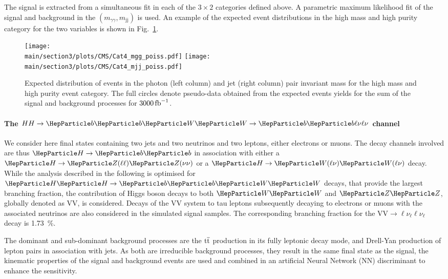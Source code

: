 The signal is extracted from a simultaneous fit in each of the $3 \times 2$ categories defined above.
A parametric maximum likelihood fit of the signal and background in the $(m_{\gamma\gamma}, m_\text{jj})$ is used.
An example of the expected event distributions in the high mass and high purity category for the two variables is shown in Fig.~\ref{sec3:CMSHH:fig:bbgg_events}.

\begin{figure}[!htb]
\centering 
    \texttt{[image: \\main/section3/plots/CMS/Cat4\_mgg\_poiss.pdf]}
    \texttt{[image: \\main/section3/plots/CMS/Cat4\_mjj\_poiss.pdf]}
\caption{Expected distribution of events in the photon (left column) and jet (right column) pair invariant mass for the high mass and high purity event category. The full circles denote pseudo-data obtained from the expected events yields for the sum of the signal and background processes for $3000\mbox{\ensuremath{\,\text{fb}^\text{$-$1}}}$.} 
\label{sec3:CMSHH:fig:bbgg_events} 
\end{figure}

\paragraph{The $HH \rightarrow \bbWW \to \PQb\PQb\ell\nu\ell\nu$ channel}

We consider here \HH final states containing two \PQb jets  and two neutrinos and two leptons, either electrons or muons.
The decay channels involved are thus $\PH\to\bb$ in association with either a $\PH\to\PZ(\ell\ell)\PZ(\nu\nu)$ or a $\PH \to \PW(\ell\nu)\PW(\ell\nu)$ decay.
While the analysis described in the following is optimised for $\HH\to\bbWW$ decays, that provide the largest branching fraction, the contribution of Higgs boson decays to both $\PW\PW$ and $\PZ\PZ$, globally denoted as $\text{VV}$, is considered.
Decays of the $\text{VV}$ system to tau leptons subsequently decaying to electrons or muons with the associated neutrinos are also considered in the simulated signal samples.
The corresponding branching fraction for the $\text{VV}\to\ell\nu_\ell\ell\nu_\ell$ decay is 1.73~\%.

The dominant and sub-dominant background processes are
the $\text{t}\overline{\text{t}}$ production in its fully leptonic decay mode, and
Drell-Yan production of lepton pairs in association with jets.
As both are irreducible background processes, \ie they result in the same final state as the signal, the kinematic properties of the signal and background events are used and combined in an artificial Neural Network (NN) discriminant to enhance the sensitivity.


